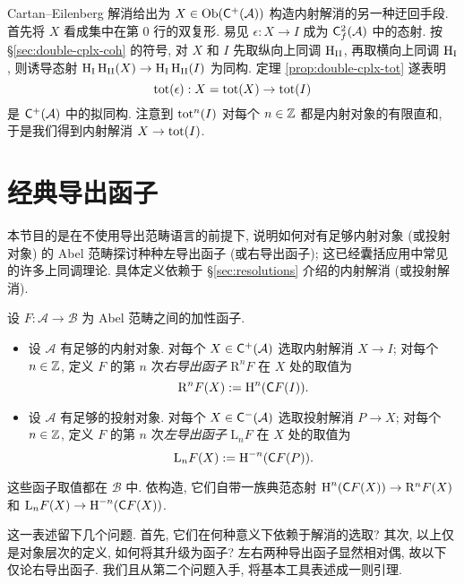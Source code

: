 \begin{remark}\label{rem:double-cplx-resolution}
	Cartan--Eilenberg 解消给出为 $X \in \operatorname{Ob}(\mathsf{C}^+(\mathcal{A}))$ 构造内射解消的另一种迂回手段. 首先将 $X$ 看成集中在第 $0$ 行的双复形. 易见 $\epsilon: X \to I$ 成为 $\mathsf{C}^2_f(\mathcal{A})$ 中的态射. 按 \S\ref{sec:double-cplx-coh} 的符号, 对 $X$ 和 $I$ 先取纵向上同调 $\operatorname{H}_{\mathrm{II}}$, 再取横向上同调 $\operatorname{H}_{\mathrm{I}}$, 则诱导态射 $\operatorname{H}_{\mathrm{I}} \operatorname{H}_{\mathrm{II}} (X) \to \operatorname{H}_{\mathrm{I}} \operatorname{H}_{\mathrm{II}} (I)$ 为同构. 定理 \ref{prop:double-cplx-tot} 遂表明
	\[ \operatorname{tot}(\epsilon): X = \operatorname{tot}(X) \to \operatorname{tot}(I) \]
	是 $\mathsf{C}^+(\mathcal{A})$ 中的拟同构. 注意到 $\operatorname{tot}^n(I)$ 对每个 $n \in \mathbb{Z}$ 都是内射对象的有限直和, 于是我们得到内射解消 $X \to \operatorname{tot}(I)$.
\end{remark}

\section{经典导出函子}\label{sec:derived-primer}
本节目的是在不使用导出范畴语言的前提下, 说明如何对有足够内射对象 (或投射对象) 的 Abel 范畴探讨种种左导出函子 (或右导出函子); 这已经囊括应用中常见的许多上同调理论. 具体定义依赖于 \S\ref{sec:resolutions} 介绍的内射解消 (或投射解消).

\begin{definition}\label{def:derived-primer}
	设 $F: \mathcal{A} \to \mathcal{B}$ 为 Abel 范畴之间的加性函子.
	\begin{itemize}
		\item 设 $\mathcal{A}$ 有足够的内射对象. 对每个 $X \in \mathsf{C}^{+}(\mathcal{A})$ 选取内射解消 $X \to I$; 对每个 $n \in \mathbb{Z}$, 定义 $F$ 的第 $n$ 次\emph{右导出函子} $\mathrm{R}^n F$ 在 $X$ 处的取值为
		\[ \mathrm{R}^n F(X) := \operatorname{H}^n(\mathsf{C}F(I)). \]
		\item 设 $\mathcal{A}$ 有足够的投射对象. 对每个 $X \in \mathsf{C}^{-}(\mathcal{A})$ 选取投射解消 $P \to X$; 对每个 $n \in \mathbb{Z}$, 定义 $F$ 的第 $n$ 次\emph{左导出函子} $\mathrm{L}_n F$ 在 $X$ 处的取值为
		\[ \mathrm{L}_n F(X) := \operatorname{H}^{-n}(\mathsf{C}F(P)). \]
	\end{itemize}
	这些函子取值都在 $\mathcal{B}$ 中. 依构造, 它们自带一族典范态射 $\operatorname{H}^n(\mathsf{C}F(X)) \to \mathrm{R}^n F(X)$ 和 $\mathrm{L}_n F(X) \to \operatorname{H}^{-n}(\mathsf{C}F(X))$.
\end{definition}

这一表述留下几个问题. 首先, 它们在何种意义下依赖于解消的选取? 其次, 以上仅是对象层次的定义, 如何将其升级为函子? 左右两种导出函子显然相对偶, 故以下仅论右导出函子. 我们且从第二个问题入手, 将基本工具表述成一则引理.

